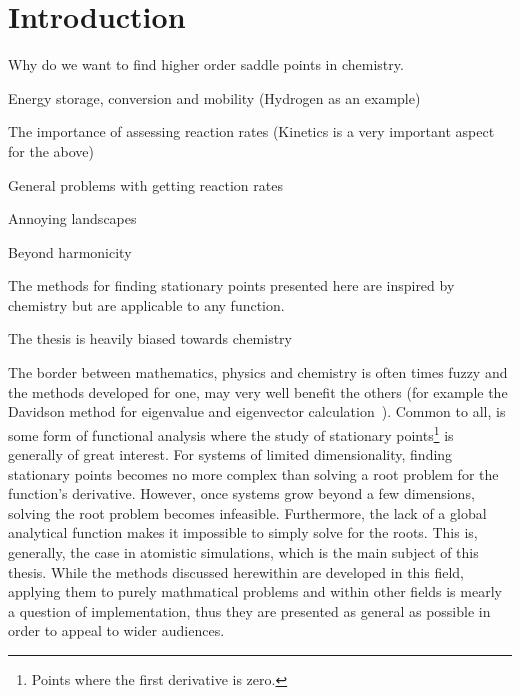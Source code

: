 \chapter{Introduction}
\label{chap:introduction}

\bit
\item Why do we want to find higher order saddle points in chemistry.
\item Energy storage, conversion and mobility (Hydrogen as an example)
\item The importance of assessing reaction rates (Kinetics is a very important aspect for the above)
\item General problems with getting reaction rates
\item Annoying landscapes
\item Beyond harmonicity
\item The methods for finding stationary points presented here are inspired by chemistry but are applicable to any function.
\item The thesis is heavily biased towards chemistry
\eit

The border between mathematics, physics and chemistry is often times fuzzy and the methods developed for one, may very well benefit the others (for example the Davidson method for eigenvalue and eigenvector calculation~\cite{davidson-method-1975}).
Common to all, is some form of functional analysis where the study of stationary points\footnote{Points where the first derivative is zero.} is generally of great interest.
For systems of limited dimensionality, finding stationary points becomes no more complex than solving a root problem for the function's derivative.
However, once systems grow beyond a few dimensions, solving the root problem becomes infeasible.
Furthermore, the lack of a global analytical function  makes it impossible to simply solve for the roots.
This is, generally, the case in atomistic simulations, which is the main subject of this thesis.
While the methods discussed herewithin are developed in this field, applying them to purely mathmatical problems and within other fields is mearly a question of implementation, thus they are presented as general as possible in order to appeal to wider audiences.

